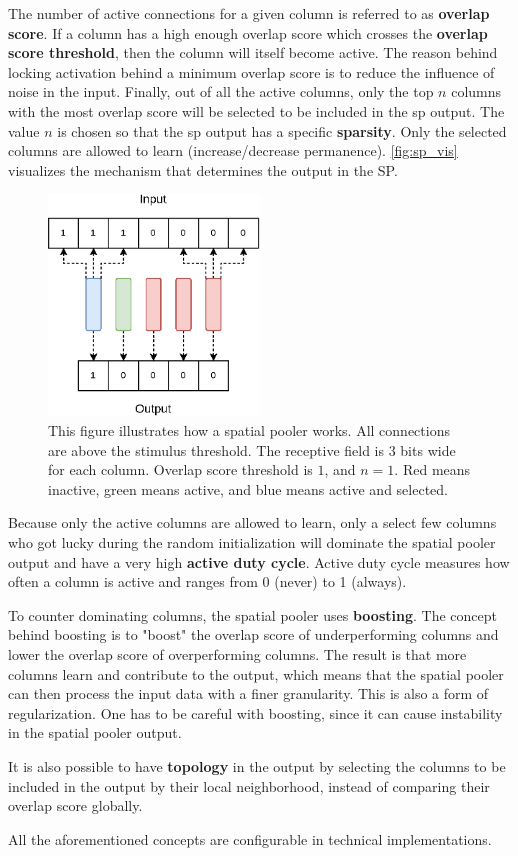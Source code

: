 The number of active connections for a given column is referred to as \textbf{overlap score}. If a column has a high enough overlap score which crosses the \textbf{overlap score threshold}, then the column will itself become active. The reason behind locking activation behind a minimum overlap score is to reduce the influence of noise in the input. Finally, out of all the active columns, only the top $n$ columns with the most overlap score will be selected to be included in the \gls*{sp} output. The value $n$ is chosen so that the \gls*{sp} output has a specific \textbf{sparsity}. Only the selected columns are allowed to learn (increase/decrease permanence). \autoref{fig:sp_vis} visualizes the mechanism that determines the output in the SP.
\par
\begin{figure}[htb]
    \centering
    \includegraphics[width=0.5\textwidth]{resources/related_works/sp_vis.eps}
    \caption[Spatial Pooler Workings]{ This figure illustrates how a spatial pooler works. All connections are above the stimulus threshold. The receptive field is 3 bits wide for each column. Overlap score threshold is $1$, and $n=1$. Red means inactive, green means active, and blue means active and selected.}
    \label{fig:sp_vis}
\end{figure}
\par
Because only the active columns are allowed to learn, only a select few columns who got lucky during the random initialization will dominate the spatial pooler output and have a very high \textbf{active duty cycle}. Active duty cycle measures how often a column is active and ranges from 0 (never) to 1 (always).
\par
To counter dominating columns, the spatial pooler uses \textbf{boosting}.
The concept behind boosting is to "boost" the overlap score of underperforming columns and lower the overlap score of overperforming columns. The result is that more columns learn and contribute to the output, which means that the spatial pooler can then process the input data with a finer granularity. This is also a form of regularization. One has to be careful with boosting, since it can cause instability in the spatial pooler output.
\par
It is also possible to have \textbf{topology} in the output by selecting the columns to be included in the output by their local neighborhood, instead of comparing their overlap score globally.
\par
All the aforementioned concepts are configurable in technical implementations.

